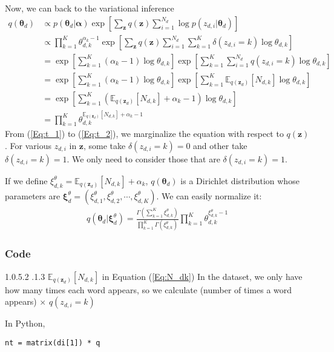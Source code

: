 \documentclass[a4paper,10.5pt,dvipdfmx]{jarticle}  %
\makeatletter
\newcommand{\subsubsubsection}{\@startsection{paragraph}{4}{\z@}%
    {1.0\Cvs \@plus.5\Cdp \@minus.2\Cdp}%
    {.1\Cvs \@plus.3\Cdp}%
    {\reset@font\normalsize}
  }
\makeatother
\begin{document}
Now, we can back to the variational inference
\begin{align}
	q(\boldsymbol{\theta}_d) &\propto p(\boldsymbol{\theta}_d | \boldsymbol{\alpha}) \exp \left[ \sum_{\boldsymbol{z}} q(\boldsymbol{z}) \sum_{i=1}^{N_d} \log p(z_{d,i} | \boldsymbol{\theta}_d) \right]\\
 &\propto \prod_{k=1}^{K} \theta_{d,k}^{\alpha_k -1} \exp \left[ \sum_{\boldsymbol{z}} q(\boldsymbol{z}) \sum_{i=1}^{N_d} \sum_{k=1}^{K} \delta({z_{d,i} = k}) \log \theta_{d,k} \right] \label{Eq:t_1} \\
&= \exp \left[ \sum_{k=1}^{K} (\alpha_k -1) \log \theta_{d,k} \right] \exp \left[ \sum_{k=1}^{K} \sum_{i=1}^{N_d} q(z_{d,i} = k) \log \theta_{d,k} \right] \label{Eq:t_2} \\
&= \exp \left[\sum_{k=1}^{K} (\alpha_k -1) \log \theta_{d,k}  \right] \exp \left[ \sum_{k=1}^{K} \mathbb{E}_{q(\boldsymbol{z}_d)}[N_{d,k}]  \log \theta_{d,k} \right] \\
&= \exp \left[ \sum_{k=1}^{K} (\mathbb{E}_{q(\boldsymbol{z}_d)}[N_{d,k}] + \alpha_k -1) \log \theta_{d,k} \right]\\
&= \prod_{k=1}^{K} \theta_{d,k}^{\mathbb{E}_{q(\boldsymbol{z}_d)}[N_{d,k}] + \alpha_k -1}
\end{align}
From (\ref{Eq:t_1}) to (\ref{Eq:t_2}), we marginalize the equation with respect to $q(\boldsymbol{z})$. For various $z_{d,i}$ in $\boldsymbol{z}$, some take $\delta({z_{d,i} = k})=0$ and other take $\delta({z_{d,i} = k})=1$. We only need to consider those that are $\delta({z_{d,i} = k})=1$. \par
If we define $\xi_{d,k}^{\theta} = \mathbb{E}_{q(\boldsymbol{z}_d)}[N_{d,k}] + \alpha_k$, $q(\boldsymbol{\theta}_d)$ is a Dirichlet distribution whose parameters are $\boldsymbol{\xi}_{d}^{\theta} = (\xi_{d,1}^{\theta}, \xi_{d,2}^{\theta}, \cdots, \xi_{d,K}^{\theta})$. We can easily normalize it:
\begin{align}
	q(\boldsymbol{\theta}_d | \boldsymbol{\xi}_{d}^{\theta}) = \frac{\Gamma (\sum_{k=1}^{K} \xi_{d,k}^{\theta})}{\prod_{k=1}^{K} \Gamma(\xi_{d,k}^{\theta})} \prod_{k=1}^{K} \theta_{d,k}^{\xi_{d,k}^{\theta} -1}
\end{align}


\subsubsection{Code}
\subsubsubsection{$\mathbb{E}_{q(\boldsymbol{z}_d)}[N_{d,k}]$ in Equation (\ref{Eq:N_dk})}
In the dataset, we only have how many times each word appears, so we calculate (number of times a word appears) $\times$ $q(z_{d,i}=k)$\par
In Python,
\begin{lstlisting}[style=Python]
nt = matrix(di[1]) * q
\end{lstlisting}
\end{document}
